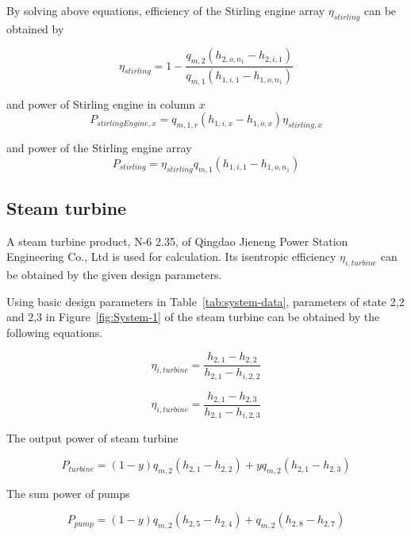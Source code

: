 \documentclass{article}
\begin{document}
By solving above equations, efficiency of the Stirling engine array $\eta_{stirling}$ can be obtained by

\begin{equation*}
	\eta_{stirling}=1-\dfrac{q_{m,2}(h_{2,o,n_{1}}-h_{2,i,1})}{q_{m,1}(h_{1,i,1}-h_{1,o,n_{1}})}\label{eq:eta_stirling-1}
\end{equation*}


and power of Stirling engine in column $x$
\begin{equation*}
	P_{stirlingEngine,x}=q_{m,1,r}(h_{1,i,x}-h_{1,o,x})\eta_{stirling,x}
\end{equation*}


and power of the Stirling engine array
\begin{equation*}
	P_{stirling}=\eta_{stirling}q_{m,1}(h_{1,i,1}-h_{1,o,n_{1}})
\end{equation*}

\subsection{Steam turbine}

A steam turbine product, N-6 2.35, of Qingdao Jieneng Power Station Engineering Co., Ltd is used for calculation. Its isentropic efficiency $\eta_{i,turbine}$ can be obtained by the given design parameters.

Using basic design parameters in Table~\ref{tab:system-data}, parameters of state 2,2 and 2,3 in Figure~\ref{fig:System-1} of the steam turbine can be obtained by the following equations.

\begin{equation*}
	\eta_{i,turbine}=\frac{h_{2,1}-h_{2,2}}{h_{2,1}-h_{i,2,2}}
\end{equation*}

\begin{equation*}
	\eta_{i,turbine}=\frac{h_{2,1}-h_{2,3}}{h_{2,1}-h_{i,2,3}}
\end{equation*}

The output power of steam turbine

\begin{equation*}
	P_{turbine}=\left(1-y\right)q_{m,2}\left(h_{2,1}-h_{2,2}\right)+yq_{m,2}\left(h_{2,1}-h_{2,3}\right)
\end{equation*}

The sum power of pumps

\begin{equation*}
	P_{pump}=\left(1-y\right)q_{m,2}\left(h_{2,5}-h_{2,4}\right)+q_{m,2}\left(h_{2,8}-h_{2,7}\right)
\end{equation*}
\end{document}
